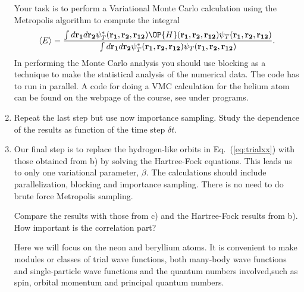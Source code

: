 \begin{prob}
\begin{enumerate}
Your task is to perform a Variational Monte Carlo calculation
using the Metropolis algorithm to compute the integral
\begin{equation}
   \langle E \rangle =
   \frac{\int d{\bf r_1}d{\bf r_2}\psi^{\ast}_T({\bf r_1},{\bf r_2}, {\bf r_{12}})\OP{H}({\bf r_1},{\bf r_2}, {\bf r_{12}})\psi_T({\bf r_1},{\bf r_2}, {\bf r_{12}})}
        {\int d{\bf r_1}d{\bf r_2}\psi^{\ast}_T({\bf r_1},{\bf r_2}, {\bf r_{12}})\psi_T({\bf r_1},{\bf r_2}, {\bf r_{12}})}.
\end{equation}
In performing the Monte Carlo analysis you should use blocking as a technique  to make the statistical analysis of the numerical data.
The code has to run in parallel. A code for doing a VMC calculation for the helium atom can be 
found on the webpage of the course, see under programs.


\item   Repeat the last step but use now  importance sampling.   Study the dependence of the results as function of the time step
$\delta t$.



\item Our final step is to replace the hydrogen-like orbits  in Eq.~(\ref{eq:trialxx}) with those obtained
from b)  by solving the Hartree-Fock equations.   This leads us to only one variational parameter, $\beta$. 
The calculations should include  parallelization, blocking and importance sampling.  There is no need to do brute
force Metropolis sampling. 

Compare the results with those from c) and the Hartree-Fock
results from b).  How important is the correlation part? 


Here we will focus on the neon and beryllium atoms.
It is convenient to make modules or classes of trial wave functions, both many-body wave functions
and single-particle wave functions  and the quantum numbers  involved,such as spin, orbital momentum and principal
quantum numbers.


\end{enumerate}
\end{prob}
